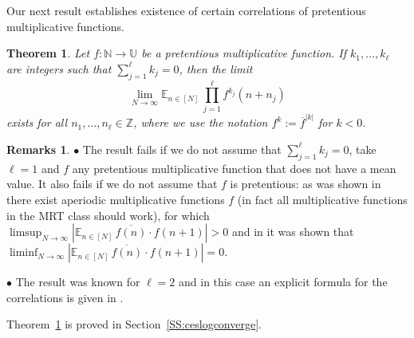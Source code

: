 \documentclass[11pt]{amsart}
\newtheorem{theorem}[lemma]{Theorem}
\theoremstyle{definition}
\newtheorem*{remarks}{Remarks}
\newcommand{\E}{{\mathbb E}}
\newcommand{\N}{{\mathbb N}}
\newcommand{\Z}{{\mathbb Z}}
\newcommand{\U}{{\mathbb U}}
\begin{document}
Our next result establishes  existence of certain correlations of pretentious multiplicative functions.
\begin{theorem}\label{T:ceslogconverge}
	Let $f\colon \N\to \U$ be a pretentious multiplicative function.  If  $k_1,\ldots, k_\ell$ are integers such that $\sum_{j=1}^\ell k_j=0$, then the limit
	\begin{equation}\label{E:corrsum0}
		\lim_{N\to\infty} \E_{n\in [N]}\, \prod_{j=1}^\ell f^{k_j}(n+n_j)
	\end{equation}
	exists 	 	for all  $n_1,\ldots, n_\ell \in \Z$, where we use the notation
	$f^k:=\overline{f}^{|k|}$ for $k<0$.
\end{theorem}
\begin{remarks}
	$\bullet$ 	The result fails if  we do not assume that $\sum_{j=1}^\ell k_j=0$, take $\ell=1$ and $f$ any pretentious multiplicative function that does not have a mean value.  It also fails if we do not assume that $f$ is pretentious: as was shown in 	 \cite[Theorem~B.1]{MRT15} there exist aperiodic multiplicative functions $f$ (in fact all multiplicative functions  in the MRT class should work),  for which   $\limsup_{N\to\infty}|\E_{n\in[N]} \, \overline{f(n)}\cdot f(n+1)|>0$ and in  \cite{GLR21} it was shown that  $\liminf_{N\to\infty}|\E_{n\in[N]} \, \overline{f(n)}\cdot f(n+1)|=0$.
	
	
	$\bullet$ The result was known for $\ell=2$ and in this case an explicit formula for the correlations is given in \cite[Theorem~1.5]{Kl17}.
\end{remarks}
Theorem~\ref{T:ceslogconverge} is proved in  Section~\ref{SS:ceslogconverge}.
\end{document}

